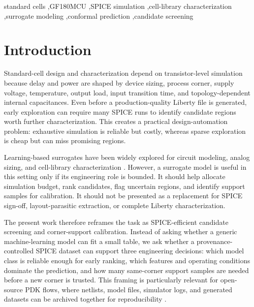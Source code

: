 \documentclass[preprint,12pt]{elsarticle}
\begin{document}
\begin{frontmatter}
\begin{keyword}
standard cells \sep GF180MCU \sep SPICE simulation \sep cell-library characterization \sep surrogate modeling \sep conformal prediction \sep candidate screening
\end{keyword}

\end{frontmatter}

\section{Introduction}

Standard-cell design and characterization depend on transistor-level simulation because delay and power are shaped by device sizing, process corner, supply voltage, temperature, output load, input transition time, and topology-dependent internal capacitances. Even before a production-quality Liberty file is generated, early exploration can require many SPICE runs to identify candidate regions worth further characterization. This creates a practical design-automation problem: exhaustive simulation is reliable but costly, whereas sparse exploration is cheap but can miss promising regions.

Learning-based surrogates have been widely explored for circuit modeling, analog sizing, and cell-library characterization \cite{Fayazi_AI_AMS_Review_2021,Afacan_ML_AnalogRF_Review_2021,Mina_ML_AnalogIC_Review_2022,Klemme_CellLib_ML_DTCO_ICCAD_2020,Klemme_Reliability_CellLib_TCASI_2021,Tang_KnowledgeTransfer_CellLib_MEJO_2025,Ma_GNN_CellLib_Integration_2025}. However, a surrogate model is useful in this setting only if its engineering role is bounded. It should help allocate simulation budget, rank candidates, flag uncertain regions, and identify support samples for calibration. It should not be presented as a replacement for SPICE sign-off, layout-parasitic extraction, or complete Liberty characterization.

The present work therefore reframes the task as SPICE-efficient candidate screening and corner-support calibration. Instead of asking whether a generic machine-learning model can fit a small table, we ask whether a provenance-controlled SPICE dataset can support three engineering decisions: which model class is reliable enough for early ranking, which features and operating conditions dominate the prediction, and how many same-corner support samples are needed before a new corner is trusted. This framing is particularly relevant for open-source PDK flows, where netlists, model files, simulator logs, and generated datasets can be archived together for reproducibility \cite{Google_GF180MCU_PDK_GitHub,Ngspice_Manual}.
\end{document}

